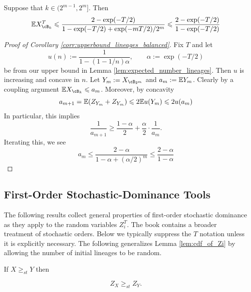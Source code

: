 \begin{subappendices}
    \begin{corollary}
\label{corr:upperbound_lineages_balanced}
        Suppose that $k \in (2^{m-1}, 2^m]$. Then
        \[\E X^T_{\cB_k} \leq \frac{2-\exp(-T/2)}{1-\exp(-T/2) + \exp(-mT/2)/2^m} \leq \frac{2-\exp(-T/2)}{1-\exp(-T/2)} \]
    \end{corollary}

    \begin{proof}[Proof of Corollary \ref{corr:upperbound_lineages_balanced}]
        Fix $T$ and let
        \[u(n) := \frac{1}{1-(1-1/n)\alpha}, \qquad \alpha := \exp(-T/2)\]
        \noindent be from our upper bound in Lemma \ref{lem:expected_number_lineages}. Then $u$ is increasing and concave in $n$. Let $Y_m := X_{\cB_{2^m}}$ and $a_m := \mathbb{E} Y_m$. Clearly by a coupling argument $\E X_{\cB_k} \leq a_m$. Moreover, by concavity
        \[a_{m+1} = \mathbb{E} (Z_{Y_{m}} + Z_{Y_{m}}) \leqslant 2 \mathbb{E} u(Y_{m}) \leqslant 2u(a_m)\]
        \noindent In particular, this implies
        \[\frac{1}{a_{m+1}} \geq \frac{1-\alpha}{2} + \frac{\alpha}{2} \cdot \frac{1}{a_m}.\]
        \noindent Iterating this, we see
        \[a_m \leq \frac{2-\alpha}{1-\alpha + (\alpha/2)^m} \leq \frac{2-\alpha}{1-\alpha} \]

    \end{proof}


\subsection{First-Order Stochastic-Dominance Tools}
\label{app:basic-stochastic-orderings}

\label{app:first-order-stochastic-dominance}

The following results collect general properties of first-order stochastic dominance as
they apply to the random variables $Z^T_i$. The book
\cite{shaked2007_stochastic_orders} contains a broader treatment of stochastic orders.
Below we typically suppress the $T$ notation unless it is explicitly necessary. The
following generalizes Lemma \ref{lem:cdf_of_Zi} by allowing the number of initial lineages
to be random.

\begin{corollary}
\label{corollary:stochastic_dominance_composition}
    If $X \geq_{st} Y$ then

    \[Z_X \geq_{st} Z_{Y}.\]


\end{corollary}
\end{subappendices}
